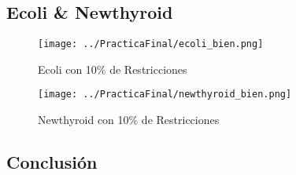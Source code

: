 \subsection{Ecoli \& Newthyroid}

\begin{figure}[H]
   \centering
   \texttt{[image: ../PracticaFinal/ecoli\_bien.png]}
   \caption{Ecoli con 10\% de Restricciones}
\end{figure}

\begin{figure}[H]
   \centering
   \texttt{[image: ../PracticaFinal/newthyroid\_bien.png]}
   \caption{Newthyroid con 10\% de Restricciones}
\end{figure}

\subsection{Conclusión}
